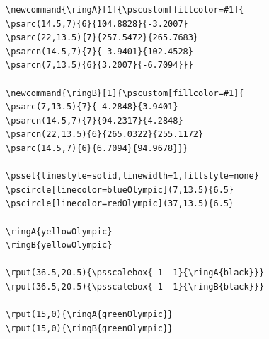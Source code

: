 \documentclass{ammTalk}
\begin{document}
\listingsTeX%
%
\newsavebox{\mybox}
\begin{lrbox}{\mybox}%
\begin{lstlisting}
\newcommand{\ringA}[1]{\pscustom[fillcolor=#1]{
\psarc(14.5,7){6}{104.8828}{-3.2007}
\psarc(22,13.5){7}{257.5472}{265.7683}
\psarcn(14.5,7){7}{-3.9401}{102.4528}
\psarcn(7,13.5){6}{3.2007}{-6.7094}}}

\newcommand{\ringB}[1]{\pscustom[fillcolor=#1]{
\psarc(7,13.5){7}{-4.2848}{3.9401}
\psarcn(14.5,7){7}{94.2317}{4.2848}
\psarcn(22,13.5){6}{265.0322}{255.1172}
\psarc(14.5,7){6}{6.7094}{94.9678}}}

\psset{linestyle=solid,linewidth=1,fillstyle=none}
\pscircle[linecolor=blueOlympic](7,13.5){6.5}
\pscircle[linecolor=redOlympic](37,13.5){6.5}

\ringA{yellowOlympic}
\ringB{yellowOlympic}

\rput(36.5,20.5){\psscalebox{-1 -1}{\ringA{black}}}
\rput(36.5,20.5){\psscalebox{-1 -1}{\ringB{black}}}

\rput(15,0){\ringA{greenOlympic}}
\rput(15,0){\ringB{greenOlympic}}
\end{lstlisting}%
\end{lrbox}%
\begin{figure}[!h]
\centering\vspace{-5mm}%
%
\end{figure}
\end{document}
